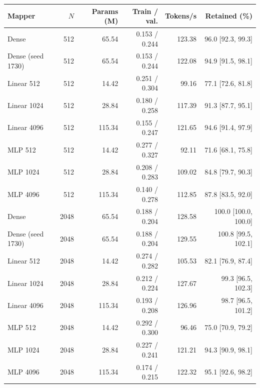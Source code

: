 \begin{tabular}{lrrrrr}
\toprule
Mapper & $N$ & Params (M) & Train / val. & Tokens/s & Retained (\%) \\
\midrule
Dense & 512 & 65.54 & 0.153 / 0.244 & 123.38 & 96.0 [92.3, 99.3] \\
Dense (seed 1730) & 512 & 65.54 & 0.153 / 0.244 & 122.08 & 94.9 [91.5, 98.1] \\
Linear 512 & 512 & 14.42 & 0.251 / 0.304 & 99.16 & 77.1 [72.6, 81.8] \\
Linear 1024 & 512 & 28.84 & 0.180 / 0.258 & 117.39 & 91.3 [87.7, 95.1] \\
Linear 4096 & 512 & 115.34 & 0.155 / 0.247 & 121.65 & 94.6 [91.4, 97.9] \\
MLP 512 & 512 & 14.42 & 0.277 / 0.327 & 92.11 & 71.6 [68.1, 75.8] \\
MLP 1024 & 512 & 28.84 & 0.208 / 0.283 & 109.02 & 84.8 [79.7, 90.3] \\
MLP 4096 & 512 & 115.34 & 0.140 / 0.278 & 112.85 & 87.8 [83.5, 92.0] \\
Dense & 2048 & 65.54 & 0.188 / 0.204 & 128.58 & 100.0 [100.0, 100.0] \\
Dense (seed 1730) & 2048 & 65.54 & 0.188 / 0.204 & 129.55 & 100.8 [99.5, 102.1] \\
Linear 512 & 2048 & 14.42 & 0.274 / 0.282 & 105.53 & 82.1 [76.9, 87.4] \\
Linear 1024 & 2048 & 28.84 & 0.212 / 0.224 & 127.67 & 99.3 [96.5, 102.3] \\
Linear 4096 & 2048 & 115.34 & 0.193 / 0.208 & 126.96 & 98.7 [96.5, 101.2] \\
MLP 512 & 2048 & 14.42 & 0.292 / 0.300 & 96.46 & 75.0 [70.9, 79.2] \\
MLP 1024 & 2048 & 28.84 & 0.227 / 0.241 & 121.21 & 94.3 [90.9, 98.1] \\
MLP 4096 & 2048 & 115.34 & 0.174 / 0.215 & 122.32 & 95.1 [92.6, 98.2] \\
\bottomrule
\end{tabular}
